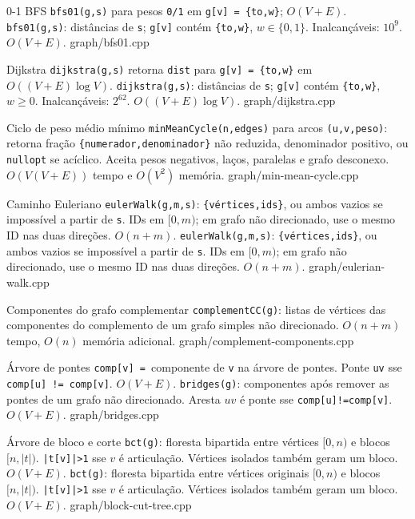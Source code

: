 \ifextended

\templateentry
{0-1 BFS}
{\texttt{bfs01(g,s)} para pesos \texttt{0/1} em \texttt{g[v] = \{to,w\}}; $O(V+E)$.}
{\texttt{bfs01(g,s)}: distâncias de \texttt{s}; \texttt{g[v]} contém \texttt{\{to,w\}}, $w\in\{0,1\}$. Inalcançáveis: $10^9$. $O(V+E)$.}
{graph/bfs01.cpp}

\templateentry
{Dijkstra}
{\texttt{dijkstra(g,s)} retorna \texttt{dist} para \texttt{g[v] = \{to,w\}} em $O((V+E)\log V)$.}
{\texttt{dijkstra(g,s)}: distâncias de \texttt{s}; \texttt{g[v]} contém \texttt{\{to,w\}}, $w\ge0$. Inalcançáveis: $2^{62}$. $O((V+E)\log V)$.}
{graph/dijkstra.cpp}

\templateentry
{Ciclo de peso médio mínimo}
{}
{\texttt{minMeanCycle(n,edges)} para arcos \texttt{(u,v,peso)}: retorna fração \texttt{\{numerador,\allowbreak denominador\}} não reduzida, denominador positivo, ou \texttt{nullopt} se acíclico. Aceita pesos negativos, laços, paralelas e grafo desconexo. $O(V(V+E))$ tempo e $O(V^2)$ memória.}
{graph/min-mean-cycle.cpp}

\fi

\templateentry
{Caminho Euleriano}
{\texttt{eulerWalk(g,m,s)}: \texttt{\{vértices,ids\}}, ou ambos vazios se impossível a partir de \texttt{s}. IDs em $[0,m)$; em grafo não direcionado, use o mesmo ID nas duas direções. $O(n+m)$.}
{\texttt{eulerWalk(g,m,s)}: \texttt{\{vértices,ids\}}, ou ambos vazios se impossível a partir de \texttt{s}. IDs em $[0,m)$; em grafo não direcionado, use o mesmo ID nas duas direções. $O(n+m)$.}
{graph/eulerian-walk.cpp}

\ifextended

\templateentry
{Componentes do grafo complementar}
{}
{\texttt{complementCC(g)}: listas de vértices das componentes do complemento de um grafo simples não direcionado. $O(n+m)$ tempo, $O(n)$ memória adicional.}
{graph/complement-components.cpp}

\fi

\templateentry
{Árvore de pontes}
{\texttt{comp[v] = }componente de \texttt{v} na árvore de pontes. Ponte \texttt{uv} sse \texttt{comp[u] != comp[v]}. $O(V+E)$.}
{\texttt{bridges(g)}: componentes após remover as pontes de um grafo não direcionado. Aresta $uv$ é ponte sse \texttt{comp[u]!=comp[v]}. $O(V+E)$.}
{graph/bridges.cpp}

\templateentry
{Árvore de bloco e corte}
{\texttt{bct(g)}: floresta bipartida entre vértices $[0,n)$ e blocos $[n,|t|)$. \texttt{|t[v]|>1} sse $v$ é articulação. Vértices isolados também geram um bloco. $O(V+E)$.}
{\texttt{bct(g)}: floresta bipartida entre vértices originais $[0,n)$ e blocos $[n,|t|)$. \texttt{|t[v]|>1} sse $v$ é articulação. Vértices isolados também geram um bloco. $O(V+E)$.}
{graph/block-cut-tree.cpp}

